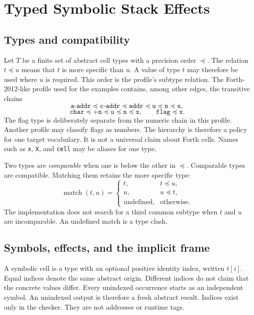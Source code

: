 \documentclass[11pt,a4paper]{article}
\begin{document}
\section{Typed Symbolic Stack Effects}
\label{sec:model}

\subsection{Types and compatibility}

Let $T$ be a finite set of abstract cell types with a precision order
$\preceq$.  The relation $t\preceq u$ means that $t$ is more specific than
$u$.  A value of type $t$ may therefore be used where $u$ is required.  This
order is the profile's subtype relation.  The Forth-2012-like profile used for the examples contains, among
other edges, the transitive chains
\[
 \texttt{a-addr}\preceq\texttt{c-addr}\preceq
 \texttt{addr}\preceq\texttt{u}\preceq\texttt{n}\preceq\texttt{x},
\]
\[
 \texttt{char}\preceq\texttt{+n}\preceq
 \texttt{u}\preceq\texttt{n}\preceq\texttt{x},
 \qquad \texttt{flag}\preceq\texttt{x}.
\]
The flag type is deliberately separate from the numeric chain in this profile.
Another profile may classify flags as numbers.  The hierarchy is therefore a
policy for one target vocabulary.  It is not a universal claim about Forth
cells.  Names such as \texttt{x}, \texttt{X}, and \texttt{cell} may be aliases
for one type.

Two types are \emph{comparable} when one is below the other in $\preceq$.
Comparable types are compatible.  Matching them retains the more specific
type:
\[
 \operatorname{match}(t,u)=
 \begin{cases}
 t,&t\preceq u,\\
 u,&u\preceq t,\\
 \text{undefined},&\text{otherwise}.
 \end{cases}
\]
The implementation does not search for a third common subtype when $t$ and
$u$ are incomparable.  An undefined match is a type clash.

\subsection{Symbols, effects, and the implicit frame}

A symbolic cell is a type with an optional positive identity index, written
$t[i]$.  Equal indices denote the same abstract origin.  Different indices do
not claim that the concrete values differ.  Every unindexed occurrence starts
as an independent symbol.  An unindexed output is therefore a fresh abstract
result.  Indices exist only in the checker.  They are not addresses or runtime
tags.
\end{document}
